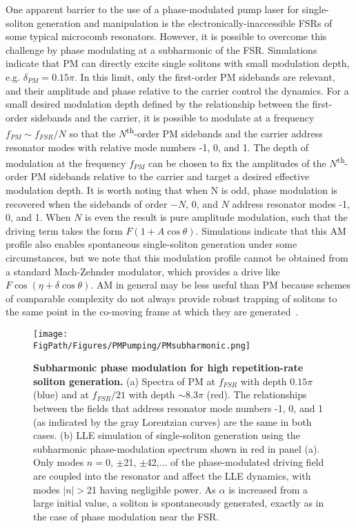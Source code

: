 One apparent barrier to the use of a phase-modulated pump laser for single-soliton generation and manipulation is the electronically-inaccessible FSRs of some typical microcomb resonators. However, it is possible to overcome this challenge by phase modulating at a subharmonic of the FSR.  Simulations indicate that PM can directly excite single solitons with small modulation depth, e.g. $\delta_{PM}=0.15\pi$. In this limit, only the first-order PM sidebands are relevant, and their amplitude and phase relative to the carrier control the dynamics. For a small desired modulation depth defined by the relationship between the first-order sidebands and the carrier, it is possible to modulate at a frequency $f_{PM}\sim f_{FSR}/N$ so that the $N$\textsuperscript{th}-order PM sidebands and the carrier address resonator modes with relative mode numbers -1, 0, and 1. The depth of modulation at the frequency $f_{PM}$ can be chosen to fix the amplitudes of the $N$\textsuperscript{th}-order PM sidebands relative to the carrier and target a desired effective modulation depth. It is worth noting that when N is odd, phase modulation is recovered when the sidebands of order $-N$, 0, and $N$ address resonator modes -1, 0, and 1. When $N$ is even the result is pure amplitude modulation, such that the driving term takes the form $F(1+A \cos{\theta})$. Simulations indicate that this AM profile also enables spontaneous single-soliton generation under some circumstances, but we note that this modulation profile cannot be obtained from a standard Mach-Zehnder modulator, which provides a drive like $F \cos(\eta+\delta \cos{\theta})$. AM in general may be less useful than PM because schemes of comparable complexity do not always provide robust trapping of solitons to the same point in the co-moving frame at which they are generated~\cite{Hendry2018}.

\begin{figure}[htpb]
	\begin{center}
		\texttt{[image: \\FigPath/Figures/PMPumping/PMsubharmonic.png]}
	\end{center}
	\caption[Subharmonic phase modulation for high repetition-rate soliton generation]{\textbf{Subharmonic phase modulation for high repetition-rate soliton generation.} (a) Spectra of PM at $f_{FSR}$ with depth $0.15\pi$ (blue) and at $f_{FSR}/21$ with depth $\sim$8.3$\pi$ (red). The relationships between the fields that address resonator mode numbers -1, 0, and 1 (as indicated by the gray Lorentzian curves) are the same in both cases. (b) LLE simulation of single-soliton generation using the subharmonic phase-modulation spectrum shown in red in panel (a). Only modes $n=0$, $\pm$21, $\pm$42,... of the phase-modulated driving field are coupled into the resonator and affect the LLE dynamics, with modes $|n|>$21 having negligible power. As $\alpha$ is increased from a large initial value, a soliton is spontaneously generated, exactly as in the case of phase modulation near the FSR.}
	\label{fig:PMsubharmonic}
\end{figure} 

